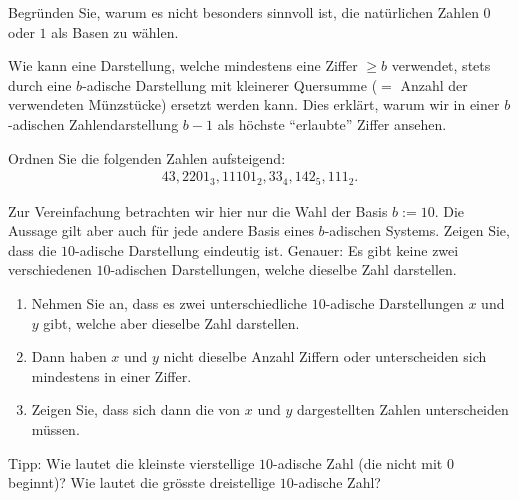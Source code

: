 \begin{mychallenge}
  Begründen Sie, warum es nicht besonders sinnvoll ist, die natürlichen Zahlen $0$ oder $1$ als Basen zu wählen.
\end{mychallenge}

\begin{mychallenge}
  Wie kann eine Darstellung, welche mindestens eine Ziffer $\geq b$ verwendet, stets durch eine
  $b$-adische Darstellung mit kleinerer Quersumme ($=$ Anzahl der verwendeten Münzstücke) ersetzt werden kann.
  Dies erklärt, warum wir in einer $b$-adischen Zahlendarstellung $b-1$ als höchste \enquote{erlaubte} Ziffer ansehen. 
\end{mychallenge}

\begin{myexercise}
  Ordnen Sie die folgenden Zahlen aufsteigend:
  \begin{align*}
    43, 2201_3, 11101_2, 33_4, 142_5, 111_2.
  \end{align*}
\end{myexercise}

\begin{mychallenge}
  Zur Vereinfachung betrachten wir hier nur die Wahl der Basis $b := 10$. Die Aussage gilt aber auch für jede andere
  Basis eines $b$-adischen Systems. Zeigen Sie, dass die $10$-adische Darstellung eindeutig ist. Genauer: Es gibt keine
  zwei verschiedenen $10$-adischen Darstellungen, welche dieselbe Zahl darstellen.
  \begin{enumerate}
    \item Nehmen Sie an, dass es zwei unterschiedliche $10$-adische Darstellungen $x$ und $y$ gibt, welche aber dieselbe
      Zahl darstellen.    
    \item Dann haben $x$ und $y$ nicht dieselbe Anzahl Ziffern oder unterscheiden sich mindestens in einer Ziffer.
    \item Zeigen Sie, dass sich dann die von $x$ und $y$ dargestellten Zahlen unterscheiden müssen. 
  \end{enumerate}
  Tipp: Wie lautet die kleinste vierstellige $10$-adische Zahl (die nicht mit $0$ beginnt)? Wie lautet die grösste
  dreistellige $10$-adische Zahl? 
\end{mychallenge}

